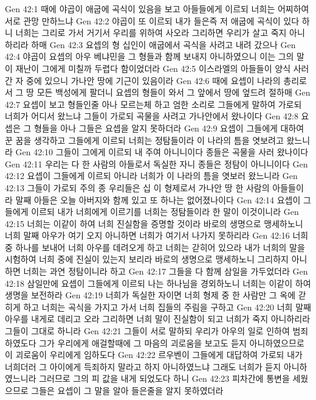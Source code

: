 Gen 42:1  때에 야곱이 애굽에 곡식이 있음을 보고 아들들에게 이르되 너희는 어찌하여 서로 관망 만하느냐
Gen 42:2  야곱이 또 이르되 내가 들은즉 저 애굽에 곡식이 있다 하니 너희는 그리로 가서 거기서 우리를 위하여 사오라 그리하면 우리가 살고 죽지 아니하리라 하매
Gen 42:3  요셉의 형 십인이 애굽에서 곡식을 사려고 내려 갔으나
Gen 42:4  야곱이 요셉의 아우 베냐민을 그 형들과 함께 보내지 아니하였으니 이는 그의 말이 재난이 그에게 미칠까 두렵다 함이었더라
Gen 42:5  이스라엘의 아들들이 양식 사러간 자 중에 있으니 가나안 땅에 기근이 있음이라
Gen 42:6  때에 요셉이 나라의 총리로서 그 땅 모든 백성에게 팔더니 요셉의 형들이 와서 그 앞에서 땅에 엎드려 절하매
Gen 42:7  요셉이 보고 형들인줄 아나 모르는체 하고 엄한 소리로 그들에게 말하여 가로되 너희가 어디서 왔느냐 그들이 가로되 곡물을 사려고 가나안에서 왔나이다
Gen 42:8  요셉은 그 형들을 아나 그들은 요셉을 알지 못하더라
Gen 42:9  요셉이 그들에게 대하여 꾼 꿈을 생각하고 그들에게 이르되 너희는 정탐들이라 이 나라의 틈을 엿보려고 왔느니라
Gen 42:10  그들이 그에게 이르되 내 주여 아니니이다 종들은 곡물을 사러 왔나이다
Gen 42:11  우리는 다 한 사람의 아들로서 독실한 자니 종들은 정탐이 아니니이다
Gen 42:12  요셉이 그들에게 이르되 아니라 너희가 이 나라의 틈을 엿보러 왔느니라
Gen 42:13  그들이 가로되 주의 종 우리들은 십 이 형제로서 가나안 땅 한 사람의 아들들이라 말째 아들은 오늘 아버지와 함께 있고 또 하나는 없어졌나이다
Gen 42:14  요셉이 그들에게 이르되 내가 너희에게 이르기를 너희는 정탐들이라 한 말이 이것이니라
Gen 42:15  너희는 이같이 하여 너희 진실함을 증명할 것이라 바로의 생명으로 맹세하노니 너희 말째 아우가 여기 오지 아니하면 너희가 여기서 나가지 못하리라
Gen 42:16  너희 중 하나를 보내어 너희 아우를 데려오게 하고 너희는 갇히어 있으라 내가 너희의 말을 시험하여 너희 중에 진실이 있는지 보리라 바로의 생명으로 맹세하노니 그리하지 아니하면 너희는 과연 정탐이니라 하고
Gen 42:17  그들을 다 함께 삼일을 가두었더라
Gen 42:18  삼일만에 요셉이 그들에게 이르되 나는 하나님을 경외하노니 너희는 이같이 하여 생명을 보전하라
Gen 42:19  너희가 독실한 자이면 너희 형제 중 한 사람만 그 옥에 갇히게 하고 너희는 곡식을 가지고 가서 너희 집들의 주림을 구하고
Gen 42:20  너희 말째 아우를 내게로 데리고 오라 그리하면 너희 말이 진실함이 되고 너희가 죽지 아니하리라 그들이 그대로 하니라
Gen 42:21  그들이 서로 말하되 우리가 아우의 일로 인하여 범죄하였도다 그가 우리에게 애걸할때에 그 마음의 괴로움을 보고도 듣지 아니하였으므로 이 괴로움이 우리에게 임하도다
Gen 42:22  르우벤이 그들에게 대답하여 가로되 내가 너희더러 그 아이에게 득죄하지 말라고 하지 아니하였느냐 그래도 너희가 듣지 아니하였느니라 그러므로 그의 피 값을 내게 되었도다 하니
Gen 42:23  피차간에 통변을 세웠으므로 그들은 요셉이 그 말을 알아 들은줄을 알지 못하였더라
